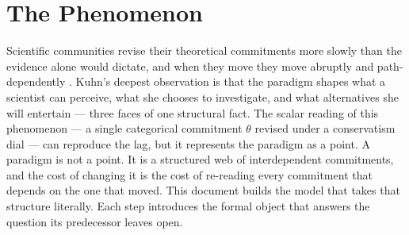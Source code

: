 %
%
%
%
%

\section{The Phenomenon}
\label{sec:phenomenon}

Scientific communities revise their theoretical commitments more slowly
than the evidence alone would dictate, and when they move they move
abruptly and path-dependently \citep{kuhn1962Structure}. Kuhn's deepest
observation is that the paradigm shapes what a scientist can perceive,
what she chooses to investigate, and what alternatives she will
entertain --- three faces of one structural fact. The scalar reading of
this phenomenon --- a single categorical commitment $\theta$ revised
under a conservatism dial --- can reproduce the lag, but it represents
the paradigm as a point. A paradigm is not a point. It is a structured
web of interdependent commitments, and the cost of changing it is the
cost of re-reading every commitment that depends on the one that moved.
This document builds the model that takes that structure literally. Each
step introduces the formal object that answers the question its
predecessor leaves open.


